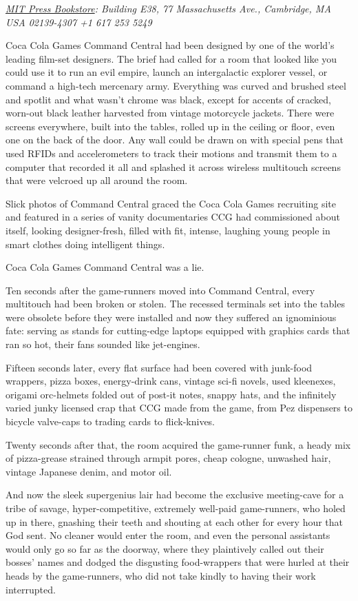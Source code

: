 \emph{\href{http://web.mit.edu/bookstore/www/}{MIT Press Bookstore}: Building E38, 77 Massachusetts Ave., Cambridge, MA USA 02139-4307 +1 617 253 5249}

Coca Cola Games Command Central had been designed by one of the
world's leading film-set designers. The brief had called for a room
that looked like you could use it to run an evil empire, launch an
intergalactic explorer vessel, or command a high-tech mercenary
army. Everything was curved and brushed steel and spotlit and what
wasn't chrome was black, except for accents of cracked, worn-out
black leather harvested from vintage motorcycle jackets. There were
screens everywhere, built into the tables, rolled up in the ceiling
or floor, even one on the back of the door. Any wall could be drawn
on with special pens that used RFIDs and accelerometers to track
their motions and transmit them to a computer that recorded it all
and splashed it across wireless multitouch screens that were
velcroed up all around the room.

Slick photos of Command Central graced the Coca Cola Games
recruiting site and featured in a series of vanity documentaries
CCG had commissioned about itself, looking designer-fresh, filled
with fit, intense, laughing young people in smart clothes doing
intelligent things.

Coca Cola Games Command Central was a lie.

Ten seconds after the game-runners moved into Command Central,
every multitouch had been broken or stolen. The recessed terminals
set into the tables were obsolete before they were installed and
now they suffered an ignominious fate: serving as stands for
cutting-edge laptops equipped with graphics cards that ran so hot,
their fans sounded like jet-engines.

Fifteen seconds later, every flat surface had been covered with
junk-food wrappers, pizza boxes, energy-drink cans, vintage sci-fi
novels, used kleenexes, origami orc-helmets folded out of post-it
notes, snappy hats, and the infinitely varied junky licensed crap
that CCG made from the game, from Pez dispensers to bicycle
valve-caps to trading cards to flick-knives.

Twenty seconds after that, the room acquired the game-runner funk,
a heady mix of pizza-grease strained through armpit pores, cheap
cologne, unwashed hair, vintage Japanese denim, and motor oil.

And now the sleek supergenius lair had become the exclusive
meeting-cave for a tribe of savage, hyper-competitive, extremely
well-paid game-runners, who holed up in there, gnashing their teeth
and shouting at each other for every hour that God sent. No cleaner
would enter the room, and even the personal assistants would only
go so far as the doorway, where they plaintively called out their
bosses' names and dodged the disgusting food-wrappers that were
hurled at their heads by the game-runners, who did not take kindly
to having their work interrupted.

